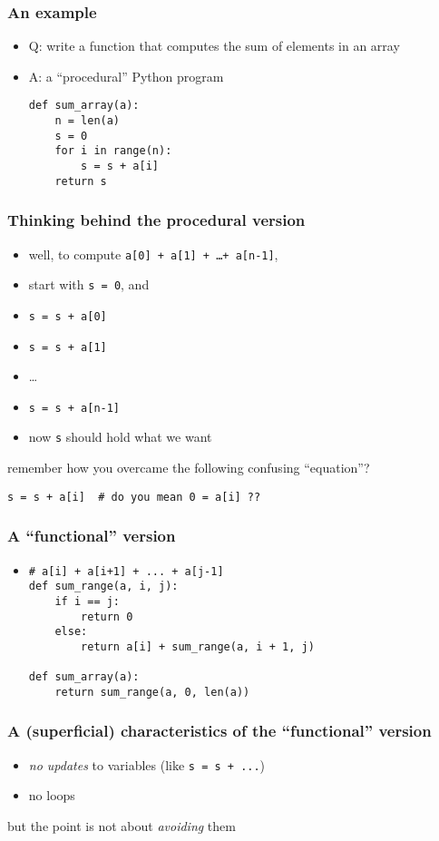 \documentclass[12pt,dvipdfmx]{beamer}
\newcommand{\ao}[1]{{\color{blue}#1}}
\begin{document}
\begin{frame}[fragile]
  \frametitle{An example}
  \begin{itemize}
  \item Q: write a function that computes the sum of elements in an array
  \item A: a ``procedural'' Python program
\begin{lstlisting}
def sum_array(a):
    n = len(a)
    s = 0
    for i in range(n):
        s = s + a[i]
    return s
\end{lstlisting}
  \end{itemize}
\end{frame}

\begin{frame}[fragile]
  \frametitle{Thinking behind the procedural version}
  \begin{itemize}
  \item well, to compute {\tt a[0] + a[1] + \ldots + a[n-1]}, 
  \item start with {\tt s = 0}, and
  \item {\tt s = s + a[0]}
  \item {\tt s = s + a[1]}
  \item \ldots
  \item {\tt s = s + a[n-1]}
  \item now {\tt s} should hold what we want
  \end{itemize}
remember how you overcame the following confusing ``equation''?
\begin{lstlisting}
s = s + a[i]  # do you mean 0 = a[i] ??
\end{lstlisting}
\end{frame}

\begin{frame}[fragile]
  \frametitle{A ``functional'' version}
  \begin{itemize}
  \item []
\begin{lstlisting}
# a[i] + a[i+1] + ... + a[j-1]
def sum_range(a, i, j):
    if i == j:
        return 0
    else:
        return a[i] + sum_range(a, i + 1, j)

def sum_array(a):
    return sum_range(a, 0, len(a))
\end{lstlisting}
\end{itemize}
\end{frame}

\begin{frame}[fragile]
  \frametitle{A (superficial) characteristics of the ``functional'' version}
  \begin{itemize}
  \item {\it no updates} to variables (like {\tt s = s + ...})
  \item no loops
  \end{itemize}
  but the point is not about \ao{\it avoiding} them
\end{frame}
\end{document}
